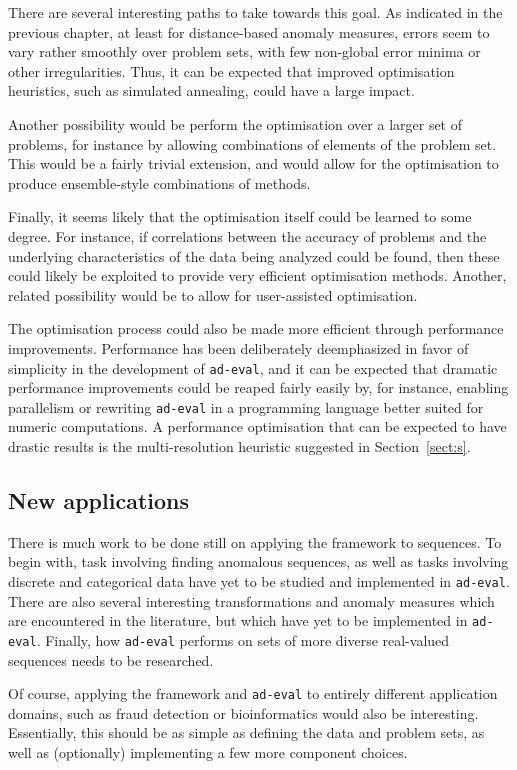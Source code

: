 There are several interesting paths to take towards this goal. As indicated in the previous chapter, at least for distance-based anomaly measures, errors seem to vary rather smoothly over problem sets, with few non-global error minima or other irregularities. Thus, it can be expected that improved optimisation heuristics, such as simulated annealing, could have a large impact.

Another possibility would be perform the optimisation over a larger set of problems, for instance by allowing combinations of elements of the problem set. This would be a fairly trivial extension, and would allow for the optimisation to produce ensemble-style combinations of methods.

Finally, it seems likely that the optimisation itself could be learned to some degree. For instance, if correlations between the accuracy of problems and the underlying characteristics of the data being analyzed could be found, then these could likely be exploited to provide very efficient optimisation methods. Another, related possibility would be to allow for user-assisted optimisation.

The optimisation process could also be made more efficient through performance improvements. Performance has been deliberately deemphasized in favor of simplicity in the development of \texttt{ad-eval}, and it can be expected that dramatic performance improvements could be reaped fairly easily by, for instance, enabling parallelism or rewriting \texttt{ad-eval} in a programming language better suited for numeric computations. A performance optimisation that can be expected to have drastic results is the multi-resolution heuristic suggested in Section~\ref{sect:s}.

\subsection{New applications}
There is much work to be done still on applying the framework to sequences. To begin with, task involving finding anomalous sequences, as well as tasks involving discrete and categorical data have yet to be studied and implemented in \texttt{ad-eval}. There are also several interesting transformations and anomaly measures which are encountered in the literature, but which have yet to be implemented in \texttt{ad-eval}. Finally, how \texttt{ad-eval} performs on sets of more diverse real-valued sequences needs to be researched.

Of course, applying the framework and \texttt{ad-eval} to entirely different application domains, such as fraud detection or bioinformatics would also be interesting. Essentially, this should be as simple as defining the data and problem sets, as well as (optionally) implementing a few more component choices.

